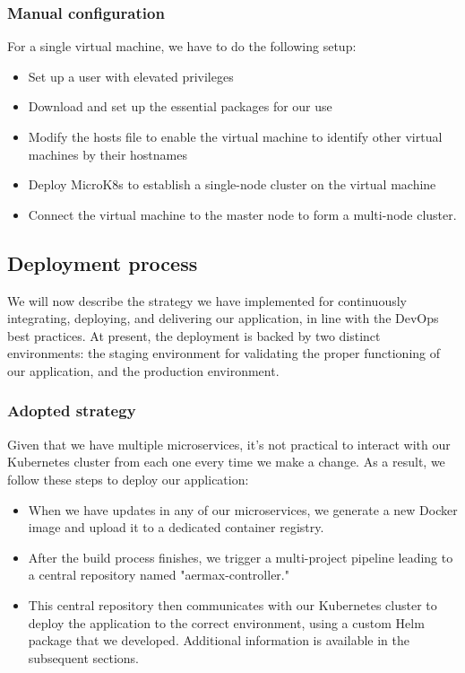 \subsubsection{Manual configuration}
For a single virtual machine, we have to do the following setup:

\begin{itemize}
  \item Set up a user with elevated privileges
  \item Download and set up the essential packages for our use
  \item Modify the hosts file to enable the virtual machine to identify other virtual machines by their hostnames
  \item Deploy MicroK8s to establish a single-node cluster on the virtual machine
  \item Connect the virtual machine to the master node to form a multi-node cluster.
\end{itemize}

\subsection{Deployment process}
We will now describe the strategy we have implemented for continuously integrating, deploying, and delivering our application, in line with the DevOps best practices. At present, the deployment is backed by two distinct environments: the staging environment for validating the proper functioning of our application, and the production environment.

\subsubsection{Adopted strategy}
Given that we have multiple microservices, it's not practical to interact with our Kubernetes cluster from each one every time we make a change. As a result, we follow these steps to deploy our application:

\begin{itemize}
  \item When we have updates in any of our microservices, we generate a new Docker image and upload it to a dedicated container registry.
  \item After the build process finishes, we trigger a multi-project pipeline leading to a central repository named "aermax-controller."
  \item This central repository then communicates with our Kubernetes cluster to deploy the application to the correct environment, using a custom Helm package that we developed. Additional information is available in the subsequent sections.

\end{itemize}


